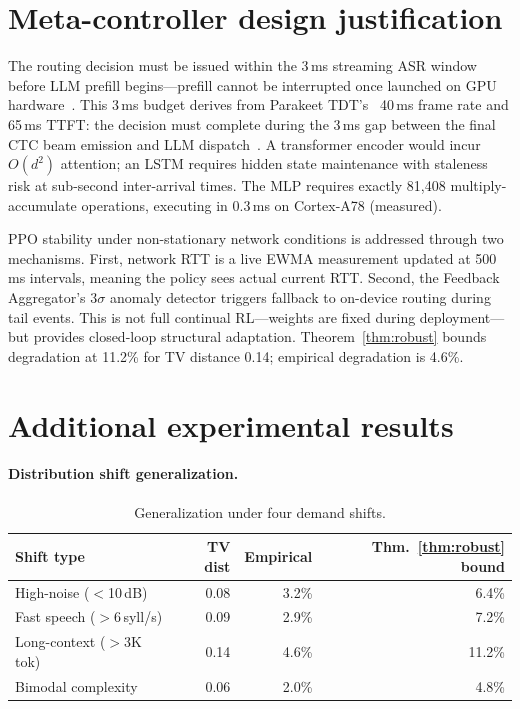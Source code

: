 \documentclass{article}
\begin{document}
\section{Meta-controller design justification}
\label{app:mlp_justification}

The routing decision must be issued within the 3\,ms streaming ASR window before LLM prefill begins---prefill cannot be interrupted once launched on GPU hardware~\citep{yu2022orca,agrawal2024sarathi}. This 3\,ms budget derives from Parakeet TDT's~\citep{parakeet2025,gulati2020conformer} 40\,ms frame rate and 65\,ms TTFT: the decision must complete during the 3\,ms gap between the final CTC beam emission and LLM dispatch~\citep{kwon2023vllm}. A transformer encoder would incur $O(d^2)$ attention; an LSTM requires hidden state maintenance with staleness risk at sub-second inter-arrival times. The MLP requires exactly 81{,}408 multiply-accumulate operations, executing in 0.3\,ms on Cortex-A78 (measured).

PPO stability under non-stationary network conditions is addressed through two mechanisms. First, network RTT is a live EWMA measurement updated at 500\,ms intervals, meaning the policy sees actual current RTT. Second, the Feedback Aggregator's $3\sigma$ anomaly detector triggers fallback to on-device routing during tail events. This is not full continual RL---weights are fixed during deployment---but provides closed-loop structural adaptation. Theorem~\ref{thm:robust} bounds degradation at 11.2\% for TV distance 0.14; empirical degradation is 4.6\%.

\section{Additional experimental results}
\label{app:additional}

\paragraph{Distribution shift generalization.}

\begin{table}[H]
\centering
\caption{Generalization under four demand shifts.}
\label{tab:shift}
\small
\begin{tabular}{lrrr}
\toprule
Shift type & TV dist & Empirical & Thm.~\ref{thm:robust} bound \\
\midrule
High-noise ($<$10\,dB)    & 0.08 & 3.2\% & 6.4\% \\
Fast speech ($>$6\,syll/s) & 0.09 & 2.9\% & 7.2\% \\
Long-context ($>$3K tok)   & 0.14 & 4.6\% & 11.2\% \\
Bimodal complexity         & 0.06 & 2.0\% & 4.8\% \\
\bottomrule
\end{tabular}
\end{table}
\end{document}
